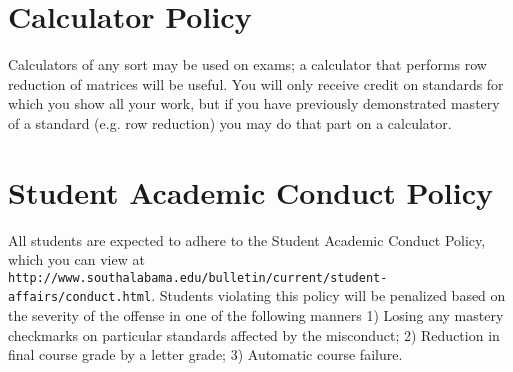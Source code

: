 \documentclass[letterpaper]{article}
\begin{document}
\section*{\fontsize{12}{15}\selectfont Calculator Policy}

Calculators of any sort may be used on exams; a calculator that performs row reduction of matrices will be useful.  You will only receive credit on standards for which you show all your work, but if you have previously demonstrated mastery of a standard (e.g. row reduction) you may do that part on a calculator.

\section*{\fontsize{12}{15}\selectfont Student Academic Conduct Policy}
All students are expected to adhere to the Student Academic Conduct Policy, which you can view at
{\tt http://www.southalabama.edu/bulletin/current/student-affairs/conduct.html}.  Students violating this policy will be penalized based on the severity of the offense in one of the following manners  1) Losing any mastery checkmarks on particular standards affected by the misconduct; 2) Reduction in final course grade by a letter grade; 3) Automatic course failure.
\end{document}
